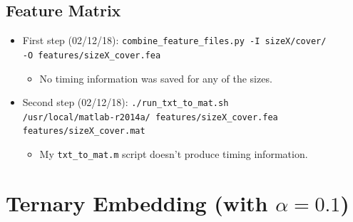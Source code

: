 \documentclass[11pt,a4paper]{report}
\begin{document}
\subsection{Feature Matrix}
\begin{itemize}
\item First step (02/12/18): \texttt{combine\_feature\_files.py -I sizeX/cover/} \\
         \texttt{-O features/sizeX\_cover.fea}
  \begin{itemize}
  \item No timing information was saved for any of the sizes.
  \end{itemize}

\item Second step (02/12/18): \texttt{./run\_txt\_to\_mat.sh} \\
         \texttt{/usr/local/matlab-r2014a/ features/sizeX\_cover.fea} \\
         \texttt{features/sizeX\_cover.mat}
  \begin{itemize}
  \item My \texttt{txt\_to\_mat.m} script doesn't produce timing information.
  \end{itemize}
\end{itemize}

\section{Ternary Embedding (with \texorpdfstring{$\alpha=0.1$}{alpha})}
\end{document}
